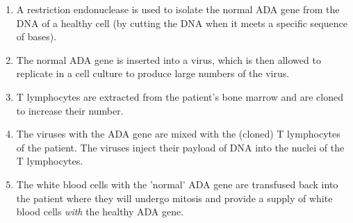 \documentclass{article}
\begin{document}
\begin{enumerate}

	\item A restriction endonuclease is used to isolate the normal ADA gene from
	the DNA of a healthy cell (by cutting the DNA when it meets a specific
	sequence of bases).

	\item The normal ADA gene is inserted into a virus, which is then allowed to
	replicate in a cell culture to produce large numbers of the virus.

	\item T lymphocytes are extracted from the patient's bone marrow and are
	cloned to increase their number.

	\item The viruses with the ADA gene are mixed with the (cloned) T
	lymphocytes of the patient. The viruses inject their payload of DNA into
	the nuclei of the T lymphocytes.

	\item The white blood cells with the 'normal' ADA gene are transfused back
	into the patient where they will undergo mitosis and provide a supply of
	white blood cells {\it with} the healthy ADA gene.

\end{enumerate}

\end{document}
